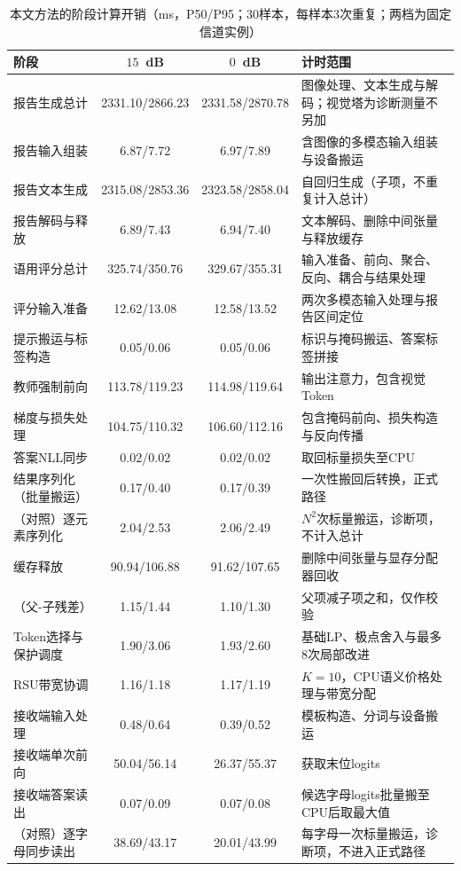 \documentclass[journal]{IEEEtran}
\begin{document}
\begin{table}[t]
\centering
\caption{本文方法的阶段计算开销（ms，P50/P95；30样本，每样本3次重复；两档为固定信道实例）}
\label{tab:latency_stages}
\renewcommand{\arraystretch}{1.05}
\begin{tabular}{lccp{}}
\hline
阶段 & $15$~dB & $0$~dB & 计时范围\\
\hline
报告生成总计 & 2331.10/2866.23 & 2331.58/2870.78 & 图像处理、文本生成与解码；视觉塔为诊断测量不另加\\
\quad 报告输入组装 & 6.87/7.72 & 6.97/7.89 & 含图像的多模态输入组装与设备搬运\\
\quad 报告文本生成 & 2315.08/2853.36 & 2323.58/2858.04 & 自回归生成（子项，不重复计入总计）\\
\quad 报告解码与释放 & 6.89/7.43 & 6.94/7.40 & 文本解码、删除中间张量与释放缓存\\
语用评分总计 & 325.74/350.76 & 329.67/355.31 & 输入准备、前向、聚合、反向、耦合与结果处理\\
\quad 评分输入准备 & 12.62/13.08 & 12.58/13.52 & 两次多模态输入处理与报告区间定位\\
\quad 提示搬运与标签构造 & 0.05/0.06 & 0.05/0.06 & 标识与掩码搬运、答案标签拼接\\
\quad 教师强制前向 & 113.78/119.23 & 114.98/119.64 & 输出注意力，包含视觉Token\\
\quad 梯度与损失处理 & 104.75/110.32 & 106.60/112.16 & 包含掩码前向、损失构造与反向传播\\
\quad 答案NLL同步 & 0.02/0.02 & 0.02/0.02 & 取回标量损失至CPU\\
\quad 结果序列化（批量搬运） & 0.17/0.40 & 0.17/0.39 & 一次性搬回后转换，正式路径\\
\quad （对照）逐元素序列化 & 2.04/2.53 & 2.06/2.49 & $N^2$次标量搬运，诊断项，不计入总计\\
\quad 缓存释放 & 90.94/106.88 & 91.62/107.65 & 删除中间张量与显存分配器回收\\
\quad （父-子残差） & 1.15/1.44 & 1.10/1.30 & 父项减子项之和，仅作校验\\
Token选择与保护调度 & 1.90/3.06 & 1.93/2.60 & 基础LP、极点舍入与最多8次局部改进\\
RSU带宽协调 & 1.16/1.18 & 1.17/1.19 & $K=10$，CPU语义价格处理与带宽分配\\
接收端输入处理 & 0.48/0.64 & 0.39/0.52 & 模板构造、分词与设备搬运\\
接收端单次前向 & 50.04/56.14 & 26.37/55.37 & 获取末位logits\\
接收端答案读出 & 0.07/0.09 & 0.07/0.08 & 候选字母logits批量搬至CPU后取最大值\\
\quad（对照）逐字母同步读出 & 38.69/43.17 & 20.01/43.99 & 每字母一次标量搬运，诊断项，不进入正式路径\\
\hline
\end{tabular}
\end{table}
\end{document}
